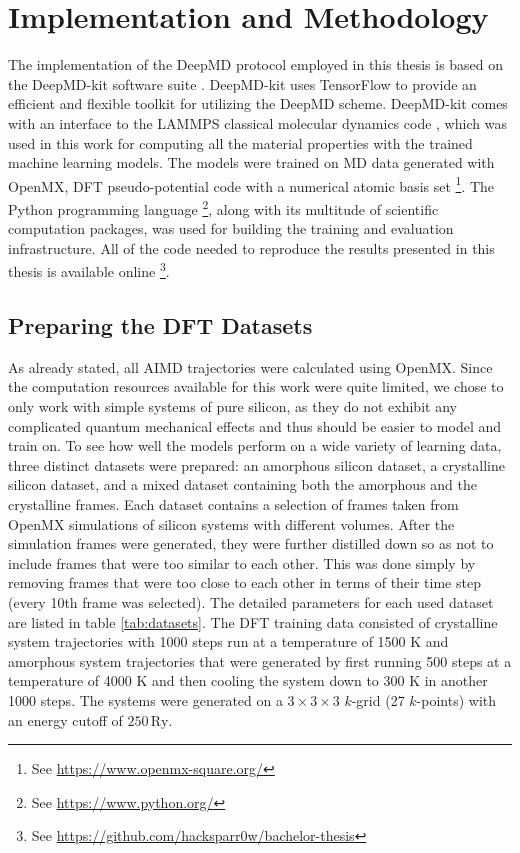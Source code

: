 \chapter{Implementation and Methodology}

The implementation of the DeepMD protocol employed in this thesis is based on
the DeepMD-kit software suite \cite{Wang_DeePMD-kit_A_deep_2018}. DeepMD-kit
uses TensorFlow \cite{tensorflow2015-whitepaper} to provide an efficient and
flexible toolkit for utilizing the DeepMD scheme. DeepMD-kit comes with an
interface to the LAMMPS classical molecular dynamics code \cite{LAMMPS},
which was used in this work for computing all the material properties with the
trained machine learning models. The models were trained on MD data generated
with OpenMX, DFT pseudo-potential code with a numerical atomic basis set
\footnote{
    See \url{https://www.openmx-square.org/}
}. The Python programming language
\footnote{
    See \url{https://www.python.org/}
}, along with its multitude of scientific computation packages, was used for
building the training and evaluation infrastructure. All of the code needed to
reproduce the results presented in this thesis is available online
\footnote{
    See \url{https://github.com/hacksparr0w/bachelor-thesis}
}.

\section{Preparing the DFT Datasets}

As already stated, all AIMD trajectories were calculated using OpenMX. Since
the computation resources available for this work were quite limited, we
chose to only work with simple systems of pure silicon, as they do not
exhibit any complicated quantum mechanical effects and thus should be easier to model and
train on. To see how well the models perform on a wide variety of learning
data, three distinct datasets were prepared: an amorphous silicon dataset, a
crystalline silicon dataset, and a mixed dataset containing both the amorphous
and the crystalline frames. Each dataset contains a selection of frames taken
from OpenMX simulations of silicon systems with different volumes. After the
simulation frames were generated, they were further distilled down so as not
to include frames that were too similar to each other. This was done simply by
removing frames that were too close to each other in terms of their time step
(every 10th frame was selected). The detailed parameters for each used dataset
are listed in table \ref{tab:datasets}. The DFT training data consisted of
crystalline system trajectories with 1000 steps run at a temperature of 1500 K
and amorphous system trajectories that were generated by first running 500
steps at a temperature of 4000 K and then cooling the system down to 300 K in
another 1000 steps. The systems were generated on a $3 \times 3 \times 3$
$k$-grid (27 $k$-points) with an energy cutoff of $250 \, \mathrm{Ry}$.

